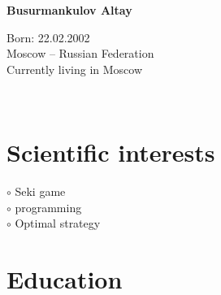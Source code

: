 \documentclass[a4paper,10pt]{article}
\begin{document}
\thispagestyle{empty}

\begin{adjustbox}{valign=t}
\begin{minipage}{0.3\textwidth} %
%
\begin{center}

\MySkip 	%

{\LARGE \bfseries Busurmankulov Altay}

\MySkip 	%

Born: 22.02.2002\\
Moscow -- Russian Federation\\
Currently living in Moscow\\

\MySkip 	%

\textcolor{ColorTwo}{\faEnvelopeO} 
 \\

\end{center}

\vfill

\section*{Scientific interests}
\raggedright
\textcolor{ColorOne}{$\circ$} Seki game\\
\textcolor{ColorOne}{$\circ$} programming\\
\textcolor{ColorOne}{$\circ$} Optimal strategy\\

\vfill

\section*{Education}
	\begin{description}
	\raggedright


\end{description}
\end{minipage}
\end{adjustbox}
\end{document}
